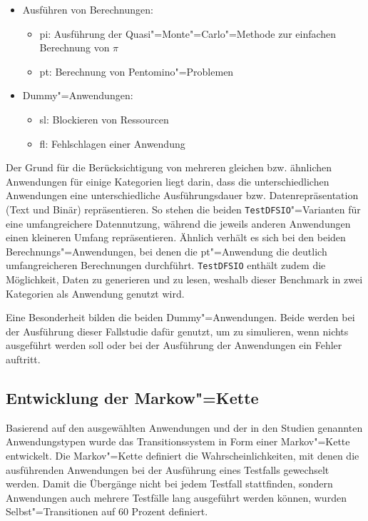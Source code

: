 \begin{itemize}
    \item Ausführen von Berechnungen:
    \begin{itemize}
        \item \acl{pi}: Ausführung der Quasi"=Monte"=Carlo"=Methode zur einfachen Berechnung von $\pi$
        \item \ac{pt}: Berechnung von Pentomino"=Problemen
    \end{itemize}

    \item Dummy"=Anwendungen:
    \begin{itemize}
        \item  \ac{sl}: Blockieren von Ressourcen
        \item  \ac{fl}: Fehlschlagen einer Anwendung
    \end{itemize}
\end{itemize}

Der Grund für die Berücksichtigung von mehreren gleichen bzw. ähnlichen Anwendungen für einige Kategorien liegt darin, dass die unterschiedlichen Anwendungen eine unterschiedliche Ausführungsdauer bzw. Datenrepräsentation (Text und Binär) repräsentieren.
So stehen die beiden \texttt{TestDFSIO}"=Varianten für eine umfangreichere Datennutzung, während die jeweils anderen Anwendungen einen kleineren Umfang repräsentieren.
Ähnlich verhält es sich bei den beiden Berechnungs"=Anwendungen, bei denen die \acl{pt}"=Anwendung die deutlich umfangreicheren Berechnungen durchführt.
\texttt{TestDFSIO} enthält zudem die Möglichkeit, Daten zu generieren und zu lesen, weshalb dieser Benchmark in zwei Kategorien als Anwendung genutzt wird.

Eine Besonderheit bilden die beiden Dummy"=Anwendungen.
Beide werden bei der Ausführung dieser Fallstudie dafür genutzt, um zu simulieren, wenn nichts ausgeführt werden soll oder bei der Ausführung der Anwendungen ein Fehler auftritt.

\subsection{Entwicklung der Markow"=Kette}
\label{subsec:markovChain}

Basierend auf den ausgewählten Anwendungen und der in den Studien genannten Anwendungstypen wurde das Transitionssystem in Form einer Markov"=Kette entwickelt.
Die Markov"=Kette definiert die Wahrscheinlichkeiten, mit denen die ausführenden Anwendungen bei der Ausführung eines Testfalls gewechselt werden.
Damit die Übergänge nicht bei jedem Testfall stattfinden, sondern Anwendungen auch mehrere Testfälle lang ausgeführt werden können, wurden Selbst"=Transitionen auf 60 Prozent definiert.

